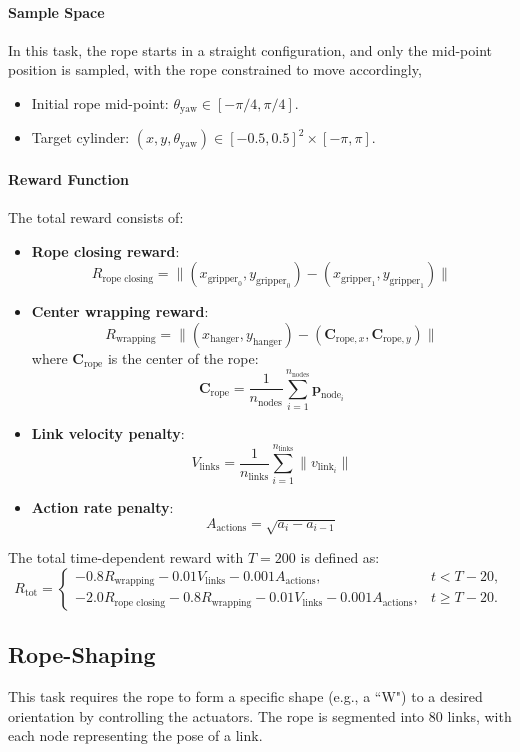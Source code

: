 \paragraph{Sample Space}
In this task, the rope starts in a straight configuration, and only the mid-point position is sampled, with the rope constrained to move accordingly,
\begin{itemize}
    \item Initial rope mid-point: $\theta_\text{yaw} \in [-\pi / 4, \pi / 4]$.
    \item Target cylinder: $(x, y, \theta_\text{yaw}) \in [-0.5, 0.5]^2 \times [-\pi, \pi]$.
\end{itemize}

\paragraph{Reward Function}
The total reward consists of:
\begin{itemize}
    \item \textbf{Rope closing reward}:
    \[
    R_{\text{rope closing}} = \| (x_{\text{gripper}_0}, y_{\text{gripper}_0}) - (x_{\text{gripper}_1}, y_{\text{gripper}_1}) \|
    \]
    \item \textbf{Center wrapping reward}:
    \[
    R_\text{wrapping} = \| (x_{\text{hanger}}, y_{\text{hanger}}) - (\mathbf{C}_{\text{rope}, x}, \mathbf{C}_{\text{rope}, y}) \|
    \]
    where $\mathbf{C}_{\text{rope}}$ is the center of the rope:
    \[
    \mathbf{C}_{\text{rope}} = \frac{1}{n_{\text{nodes}}} \sum_{i=1}^{n_{\text{nodes}}} \mathbf{p}_{\text{node}_i}
    \]
    \item \textbf{Link velocity penalty}:
    \[
    V_{\text{links}} = \frac{1}{n_{\text{links}}} \sum_{i=1}^{n_{\text{links}}} \| v_{\text{link}_i} \|
    \]
    \item \textbf{Action rate penalty}:
    \[
    A_{\text{actions}} = \sqrt{a_{i} - a_{i-1}}
    \]
\end{itemize}

The total time-dependent reward with $T=200$ is defined as:
\[
R_\text{tot} = \begin{cases}
    - 0.8 R_\text{wrapping} - 0.01 V_{\text{links}} - 0.001 A_{\text{actions}}, & t < T-20, \\
    - 2.0 R_\text{rope closing} - 0.8 R_\text{wrapping} - 0.01 V_{\text{links}} - 0.001 A_{\text{actions}}, & t \geq T-20.
\end{cases}
\]

\subsection{Rope-Shaping}
This task requires the rope to form a specific shape (e.g., a ``W") to a desired orientation by controlling the actuators. The rope is segmented into 80 links, with each node representing the pose of a link.

